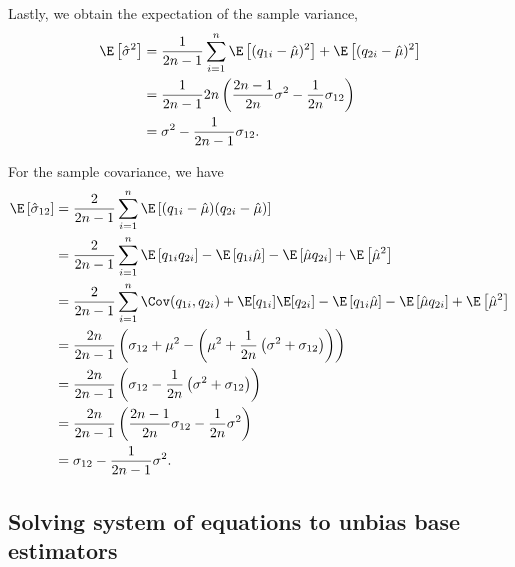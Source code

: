 \documentclass[11pt]{article}
\begin{document}
Lastly, we obtain the expectation of the sample variance,
\begin{align*}
  \E \left[ \hat{\sigma}^2 \right]
  &=
    \frac{1}{2n - 1} \sum_{i=1}^n \E \left[ ( q_{1i} - \hat{\mu} )^2 \right] + \E \left[ ( q_{2i} - \hat{\mu} )^2 \right] 
  \\
  &=
    \frac{1}{2n - 1} 2n \left( \frac{2n-1}{2n} \sigma^2 - \frac{1}{2n} \sigma_{12} \right)
  \\
  &=
    \sigma^2 - \frac{1}{2n - 1} \sigma_{12}
    .
\end{align*}

For the sample covariance, we have
\begin{align*}
  \E \left[ \hat{\sigma}_{12} \right]
  &=
    \frac{2}{2n - 1}\sum_{i=1}^n \E \left[ ( q_{1i} - \hat{\mu} )( q_{2i} - \hat{\mu} ) \right]
  \\
  &=
    \frac{2}{2n - 1} \sum_{i=1}^n
    \E \left[ q_{1i} q_{2i} \right]
    - \E \left[ q_{1i} \hat{\mu} \right]
    - \E \left[ \hat{\mu} q_{2i} \right]
    + \E \left[ \hat{\mu}^2 \right]
  \\
  &=
    \frac{2}{2n - 1} \sum_{i=1}^n
    \Cov ( q_{1i}, q_{2i} )
    + \E [ q_{1i} ] \E[ q_{2i} ]
    - \E \left[ q_{1i} \hat{\mu} \right]
    - \E \left[ \hat{\mu} q_{2i} \right]
    + \E \left[ \hat{\mu}^2 \right]
  \\
  &=
    \frac{2n}{2n - 1} \left(
    \sigma_{12}
    + \mu^2
    - \left( \mu^2 + \frac{1}{2n} \left( \sigma^2 + \sigma_{12} \right) \right)
    \right)
  \\
  &=
    \frac{2n}{2n - 1} \left(
    \sigma_{12}
    - \frac{1}{2n} \left( \sigma^2 + \sigma_{12} \right)
    \right)
  \\
  &=
    \frac{2n}{2n - 1} \left(
    \frac{2n-1}{2n} \sigma_{12}
    - \frac{1}{2n} \sigma^2
    \right)
  \\
  &=
    \sigma_{12}
    - \frac{1}{2n-1} \sigma^2
    .
\end{align*}

\subsection{Solving system of equations to unbias base estimators}

\label{sec:system}
\end{document}
